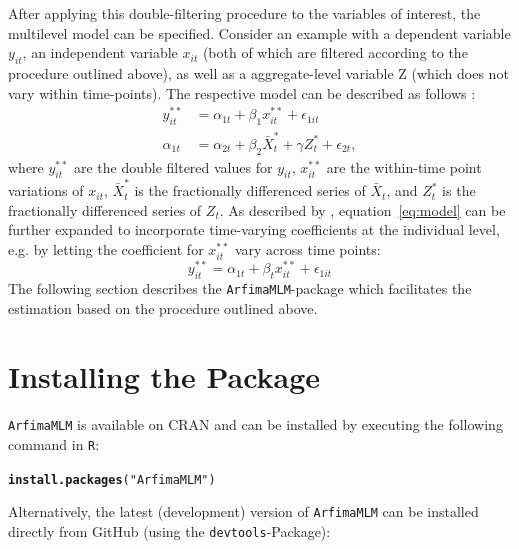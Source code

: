 \documentclass[12pt]{paper}\usepackage[]{graphicx}\usepackage[]{color}
\makeatletter
\newcommand{\hlstr}[1]{\textcolor[rgb]{0.192,0.494,0.8}{#1}}%
\newcommand{\hlstd}[1]{\textcolor[rgb]{0.345,0.345,0.345}{#1}}%
\newcommand{\hlkwd}[1]{\textcolor[rgb]{0.737,0.353,0.396}{\textbf{#1}}}%
\newenvironment{kframe}{%
 \def\at@end@of@kframe{}%
 \ifinner\ifhmode%
  \def\at@end@of@kframe{\end{minipage}}%
  \begin{minipage}{\columnwidth}%
 \fi\fi%
 \def\FrameCommand##1{\hskip\@totalleftmargin \hskip-\fboxsep
 \colorbox{shadecolor}{##1}\hskip-\fboxsep
     \hskip-\linewidth \hskip-\@totalleftmargin \hskip\columnwidth}%
 \MakeFramed {\advance\hsize-\width
   \@totalleftmargin\z@ \linewidth\hsize
   \@setminipage}}%
 {\par\unskip\endMakeFramed%
 \at@end@of@kframe}
\newenvironment{knitrout}{}{} %
\makeatother
\begin{document}
After applying this double-filtering procedure to the variables of interest, the multilevel model can be specified. Consider an example with a dependent variable $y_{it}$, an independent variable $x_{it}$ (both of which are filtered according to the procedure outlined above), as well as a aggregate-level variable Z (which does not vary within time-points). The respective model can be described as follows \citep{lebo2015effective}:
\begin{align}
y_{it}^{**}&=\alpha_{1t}+\beta_1 x_{it}^{**} + \epsilon_{1it} \label{eq:model}\\
\alpha_{1t}&=\alpha_{2t}+\beta_2 \bar{X}_{t}^{*} + \gamma Z_t^* + \epsilon_{2t},
\end{align}
where $y_{it}^{**}$ are the double filtered values for $y_{it}$, $x_{it}^{**}$ are the within-time point variations of $x_{it}$, $\bar{X}_{t}^{*}$ is the fractionally differenced series of $\bar{X}_t$, and $Z_t^*$ is the fractionally differenced series of $Z_t$. As described by \citet{lebo2015effective}, equation~\eqref{eq:model} can be further expanded to incorporate time-varying coefficients at the individual level, e.g. by letting the coefficient for $x_{it}^{**}$ vary across time points:
\begin{equation}
y_{it}^{**}=\alpha_{1t}+\beta_t x_{it}^{**} + \epsilon_{1it}
\end{equation}
The following section describes the \texttt{ArfimaMLM}-package which facilitates the estimation based on the procedure outlined above.


\section{Installing the Package}

\texttt{ArfimaMLM} is available on CRAN and can be installed by executing the following command in \texttt{R}:

\begin{knitrout}
\color{fgcolor}\begin{kframe}
\begin{alltt}
\hlkwd{install.packages}\hlstd{(}\hlstr{"ArfimaMLM"}\hlstd{)}
\end{alltt}
\end{kframe}
\end{knitrout}



\noindent Alternatively, the latest (development) version of \texttt{ArfimaMLM} can be installed directly from GitHub (using the \texttt{devtools}-Package):
\end{document}
